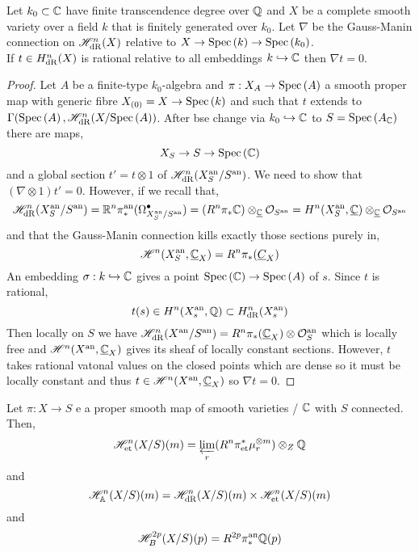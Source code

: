 \documentclass[12pt]{article}
\begin{document}
\newcommand{\et}{\mathrm{et}}
\newcommand{\fin}{\mathrm{fin}}

\begin{proposition}
Let $k_0 \subset \mathbb{C}$ have finite transcendence degree over $\mathbb{Q}$ and $X$ be a complete smooth variety over a field $k$ that is finitely generated over $k_0$. Let $\nabla$ be the Gauss-Manin connection on $\mathscr{H}^n_{\mathrm{dR}}(X)$ relative to $X \to \mathrm{Spec}\left( k \right) \to \mathrm{Spec}\left( k_0 \right)$.
\bigskip\\
If $t \in H^n_{\mathrm{dR}}(X)$ is rational relative to all embeddings $k \hookrightarrow  \mathbb{C}$ then $\nabla t = 0$. 
\end{proposition}

\begin{proof}
Let $A$ be a finite-type $k_0$-algebra and $\pi : X_A \to \mathrm{Spec}\left( A \right)$ a smooth proper map with generic fibre $X_{(0)} = X \to \mathrm{Spec}\left( k \right)$ and such that $t$ extends to $\Gamma(\mathrm{Spec}\left( A \right), \mathscr{H}^n_{\mathrm{dR}}(X / \mathrm{Spec}\left( A \right))$. After bse change via $k_0 \hookrightarrow \mathbb{C}$ to $S = \mathrm{Spec}\left( A_{\mathbb{C}} \right)$ there are maps,
\[ X_S \to S \to \mathrm{Spec}\left( \mathbb{C} \right) \]
and a global section $t' = t \otimes 1$ of $\mathscr{H}^n_{\mathrm{dR}}(X_S^{\mathrm{an}} / S^{\mathrm{an}})$. We need to show that $(\nabla \otimes 1) t' = 0$. However, if we recall that,
\[ \mathscr{H}^n_{\mathrm{dR}}(X_S^{\mathrm{an}} / S^{\mathrm{an}}) = \mathbb{R}^n \pi_*^{\mathrm{an}} (\Omega^\bullet_{X_S^{\mathrm{an}} / S^{\mathrm{an}}}) = (R^n \pi_* \mathbb{C}) \otimes_{\underline{\mathbb{C}}} \mathcal{O}_{S^{\mathrm{an}}} = H^n(X^{\mathrm{an}}_S, \underline{\mathbb{C}}) \otimes_{\underline{\mathbb{C}}} \mathcal{O}_{S^{\mathrm{an}}} \]
and that the Gauss-Manin connection kills exactly those sections purely in,
\[ \mathscr{H}^n(X^{\mathrm{an}}_S, \underline{\mathbb{C}}_X) = R^n \pi_* (\underline{C}_X) \]
An embedding $\sigma : k \hookrightarrow \mathbb{C}$ gives a point $\mathrm{Spec}\left( \mathbb{C} \right) \to \mathrm{Spec}\left( A \right)$ of $s$. Since $t$ is rational,
\[ t(s) \in H^n(X^{\mathrm{an}}_s, \mathbb{Q}) \subset H^n_{\mathrm{dR}}(X^{\mathrm{an}}_s) \]
Then locally on $S$ we have $\mathscr{H}^n_{\mathrm{dR}}(X^{\mathrm{an}} / S^{\mathrm{an}}) = R^n \pi_*(\underline{\mathbb{C}}_X) \otimes \mathcal{O}_{S}^{\mathrm{an}}$ which is locally free and $\mathscr{H}^n(X^{\mathrm{an}}, \underline{\mathbb{C}}_X)$ gives its sheaf of locally constant sections. However, $t$ takes rational vatonal values on the closed points which are dense so it must be locally constant and thus $t \in \mathscr{H}^n(X^{\mathrm{an}}, \underline{\mathbb{C}}_X)$ so $\nabla t = 0$.
\end{proof}

\begin{definition}
Let $\pi : X \to S$ e a proper smooth map of smooth varieties / $\mathbb{C}$ with $S$ connected. Then,
\[ \H^n_{\et}(X/S)(m) = \varprojlim_r (R^n \pi^*_{\et} \mu_r^{\otimes m} ) \otimes_Z \Q \]
and
\[ \H^n_{\A}(X/S)(m) = \H^n_{\dR}(X/S)(m) \times \H^n_{\et}(X/S)(m) \]
and
\[ \mathscr{H}_B^{2 p}(X/S)(p) = R^{2p} \pi_*^{\mathrm{an}} \mathbb{Q}(p) \]
\end{definition}
\end{document}
